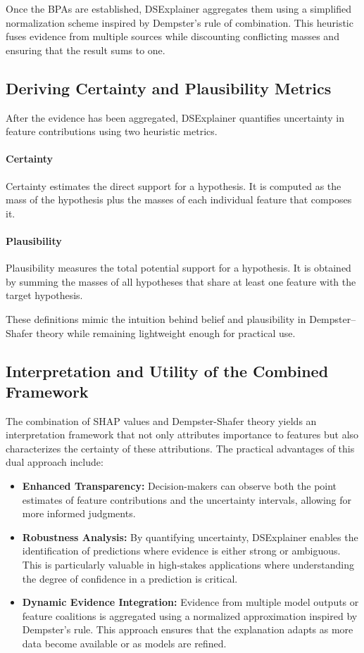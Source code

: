 \documentclass[acmlarge]{acmart}
\begin{document}
Once the BPAs are established, DSExplainer aggregates them using a simplified normalization scheme inspired by Dempster's rule of combination. This heuristic fuses evidence from multiple sources while discounting conflicting masses and ensuring that the result sums to one.

\subsection{Deriving Certainty and Plausibility Metrics}

After the evidence has been aggregated, DSExplainer quantifies uncertainty in feature contributions using two heuristic metrics.

\paragraph{Certainty}
Certainty estimates the direct support for a hypothesis. It is computed as the mass of the hypothesis plus the masses of each individual feature that composes it.

\paragraph{Plausibility}
Plausibility measures the total potential support for a hypothesis. It is obtained by summing the masses of all hypotheses that share at least one feature with the target hypothesis.

These definitions mimic the intuition behind belief and plausibility in Dempster--Shafer theory while remaining lightweight enough for practical use.


\subsection{Interpretation and Utility of the Combined Framework}

The combination of SHAP values and Dempster-Shafer theory yields an interpretation framework that not only attributes importance to features but also characterizes the certainty of these attributions. The practical advantages of this dual approach include:
\begin{itemize}
    \item \textbf{Enhanced Transparency:}  
    Decision-makers can observe both the point estimates of feature contributions and the uncertainty intervals, allowing for more informed judgments.
    \item \textbf{Robustness Analysis:}  
    By quantifying uncertainty, DSExplainer enables the identification of predictions where evidence is either strong or ambiguous. This is particularly valuable in high-stakes applications where understanding the degree of confidence in a prediction is critical.
    \item \textbf{Dynamic Evidence Integration:}
    Evidence from multiple model outputs or feature coalitions is aggregated using a normalized approximation inspired by Dempster's rule. This approach ensures that the explanation adapts as more data become available or as models are refined.
\end{itemize}
\end{document}
